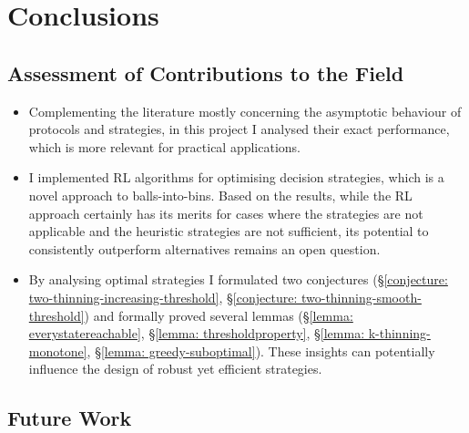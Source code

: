 
\chapter{Conclusions}\label{conclusion}

\ifpdf
    \graphicspath{{Chapter3/Figs/Raster/}{Chapter3/Figs/PDF/}{Chapter3/Figs/}}
\else
    \graphicspath{{Chapter3/Figs/Vector/}{Chapter3/Figs/}}
\fi


\section{Assessment of Contributions to the Field}


\begin{itemize}
    \item Complementing the literature mostly concerning the asymptotic behaviour of protocols and strategies, in this project I analysed their exact performance, which is more relevant for practical applications.
    \item I implemented RL algorithms for optimising decision strategies, which is a novel approach to balls-into-bins. Based on the results, while the RL approach certainly has its merits for cases where the \DP strategies are not applicable and the heuristic strategies are not sufficient, its potential to consistently outperform alternatives remains an open question.
    \item By analysing optimal strategies I formulated two conjectures (\S\ref{conjecture: two-thinning-increasing-threshold}, \S\ref{conjecture: two-thinning-smooth-threshold}) and formally proved several lemmas (\S\ref{lemma: everystatereachable}, \S\ref{lemma: thresholdproperty}, \S\ref{lemma: k-thinning-monotone}, \S\ref{lemma: greedy-suboptimal}). These insights can potentially influence the design of robust yet efficient strategies.
\end{itemize}


\section{Future Work}

